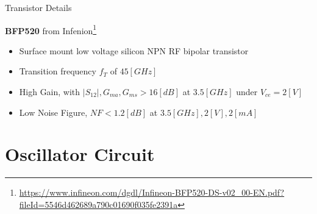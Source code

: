 \documentclass{beamer}
\begin{document}
\begin{frame}{Transistor Details}
\begin{center}
  \textbf{BFP520} from Infenion\footnote{\url{https://www.infineon.com/dgdl/Infineon-BFP520-DS-v02_00-EN.pdf?fileId=5546d462689a790c01690f035fe2391a}}
\end{center}
\begin{itemize}
  \item <2-> Surface mount low voltage silicon NPN RF bipolar transistor
  \item <3-> Transition frequency \(f_T\) of \(45[GHz]\)
  \item <4-> High Gain, with \(|S_{12}|, G_{ma}, G_{ms} > 16[dB]\) at \(3.5[GHz]\) under \(V_{ce} = 2[V]\)
  \item <5-> Low Noise Figure, \(NF < 1.2[dB]\) at \(3.5[GHz], 2[V], 2[mA]\)
\end{itemize}
\end{frame}



\section{Oscillator Circuit}
\end{document}
